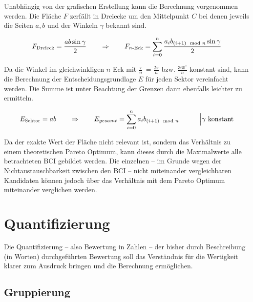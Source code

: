 Unabhängig von der grafischen Erstellung kann die Berechnung vorgenommen werden.
Die Fläche \(F\) zerfällt in Dreiecke um den Mittelpunkt \(C\) bei denen jeweils die Seiten \(a, b\) und der Winkeln \(\gamma\) bekannt sind.

\[
F_{\text{Dreieck}} = \frac{ab\sin{\gamma}}{2}
\text{\hspace{2em}}\Rightarrow{}\text{\hspace{2em}}
F_{n\text{-Eck}} = \sum_{i=0}^{n} \frac{a_{i} b_{(i+1)\mod n} \sin{\gamma}}{2}
\]

Da die Winkel im gleichwinkligen \(n\)-Eck mit %
\( \frac{\tau}{n}\ = \frac{2\pi}{n}\) bzw. \(\frac{360^\circ{}}{n}\) konstant sind,
kann die Berechnung der Entscheidungsgrundlage \(E\) für jeden Sektor vereinfacht werden.
Die Summe ist unter Beachtung der Grenzen dann ebenfalls leichter zu ermitteln.

\[
E_{\text{Sektor}} = ab 
\text{\hspace{2em}}\Rightarrow{}\text{\hspace{2em}}
E_{gesamt} = \sum_{i=0}^{n} a_{i} b_{(i+1)\mod n}\text{\hspace{3em}}\Big|{\gamma \text{ konstant}}
\]

Da der exakte Wert der Fläche nicht relevant ist, sondern das Verhältnis zu einem theoretischen Pareto Optimum,
kann dieses durch die Maximalwerte alle betrachteten \gls{BCI} gebildet werden.
Die einzelnen -- im Grunde wegen der Nichtaustauschbarkeit zwischen den \gls{BCI} -- nicht miteinander vergleichbaren
Kandidaten können jedoch über das Verhältnis mit dem Pareto Optimum miteinander verglichen werden.



\section{Quantifizierung}

Die Quantifizierung -- also Bewertung in Zahlen -- der bisher durch Beschreibung (in Worten) durchgeführten Bewertung soll das Verständnis für die Wertigkeit klarer zum Ausdruck bringen und die Berechnung ermöglichen.


\subsection{Gruppierung}

